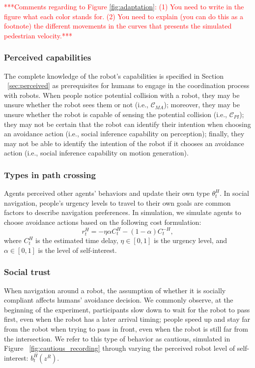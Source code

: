 \documentclass[letterpaper, 10 pt, conference]{ieeeconf}  %
\begin{document}
\textcolor{red}{***Comments regarding to Figure \ref{fig:adaptation}: (1) You need to write in the figure what each color stands for. (2) You need to explain (you can do this as a footnote) the different movements in the curves that presents the simulated pedestrian velocity.***}

\subsubsection{Perceived capabilities}
The complete knowledge of the robot's capabilities is specified in Section 
~\ref{sec:perceived} as prerequisites for humans to engage in the 
coordination process with robots. When people notice potential collision with 
a robot, they may be unsure whether the robot sees them or not (i.e., 
$\mathcal{C}_{MA}$); moreover, they may be unsure whether the robot is capable 
of sensing the potential collision (i.e., $\mathcal{C}_{PI}$); they may not be 
certain that the robot can identify their intention when choosing 
an avoidance action (i.e., 
social inference capability on perception); finally, they may not be able to 
identify the intention of the robot if it chooses an avoidance action (i.e., 
social inference capability on motion generation). 

\subsubsection{Types in path crossing}
Agents perceived other agents' behaviors and update their own type $\theta^H_t$. In social navigation, 
people's urgency levels to travel to their own goals are common factors to 
describe navigation preferences. In simulation, we simulate agents to choose 
avoidance actions based on the following cost formulation:
\begin{equation}
  r^H_t = -\eta \alpha C^H_t  -(1-\alpha) C^{-H}_t,
\end{equation}
where $C^H_t$ is the estimated time delay, $\eta \in [0,1]$ is the urgency 
level, and $\alpha \in [0,1]$ is the level of self-interest.

\subsubsection{Social trust}
When navigation around a robot, the assumption of whether it is socially compliant affects humans' avoidance decision. We commonly observe, at the beginning of the experiment, participants slow down to wait for the robot to pass first, even when the robot has a later arrival timing; people speed up and stay far from the robot when trying to pass in front, even when the robot is still far from the intersection. 
We refer to this type of behavior as cautious, simulated in Figure ~\ref{fig:cautious_recording} through 
varying the perceived robot level of self-interest: $b^H_t(z^R)$. 
\end{document}
